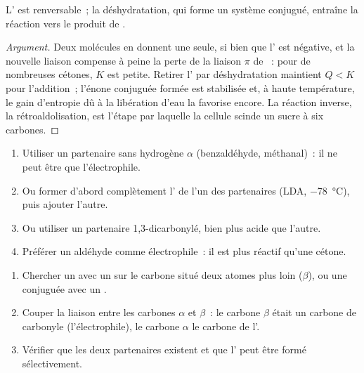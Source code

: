 \begin{proposition}\label{prop:b2:enolates-aldol:aldol-equilibrium}
L' est renversable~; la déshydratation, qui forme un système conjugué, entraîne la
réaction vers le produit de .
\end{proposition}

\begin{proof}[Argument]
Deux molécules en donnent une seule, si bien que l' est négative, et la nouvelle
liaison  compense à peine la perte de la liaison $\pi$ de ~: pour de nombreuses
cétones, $K$ est petite. Retirer l' par déshydratation maintient $Q < K$ pour l'addition~;
l'énone conjuguée formée est stabilisée et, à haute température, le gain d'entropie dû à la
libération d'eau la favorise encore. La réaction inverse, la rétroaldolisation, est l'étape par
laquelle la cellule scinde un sucre à six carbones.
\end{proof}

\begin{method}\label{met:b2:enolates-aldol:crossed-aldol}
\begin{enumerate}
  \item Utiliser un partenaire sans hydrogène $\alpha$ (benzaldéhyde, méthanal)~: il ne peut être que
        l'électrophile.
  \item Ou former d'abord complètement l' de l'un des partenaires (LDA, \qty{-78}{\degreeCelsius}),
        puis ajouter l'autre.
  \item Ou utiliser un partenaire 1,3-dicarbonylé, bien plus acide que l'autre.
  \item Préférer un aldéhyde comme électrophile~: il est plus réactif qu'une cétone.
\end{enumerate}
\end{method}

\begin{method}\label{met:b2:enolates-aldol:aldol-recognition}
\begin{enumerate}
  \item Chercher un  avec un  sur le carbone situé deux atomes plus loin ($\beta$), ou
        une  conjuguée avec un .
  \item Couper la liaison entre les carbones $\alpha$ et $\beta$~: le carbone $\beta$ était un carbone de
        carbonyle (l'électrophile), le carbone $\alpha$ le carbone de l'.
  \item Vérifier que les deux partenaires existent et que l' peut être formé sélectivement.
\end{enumerate}
\end{method}


